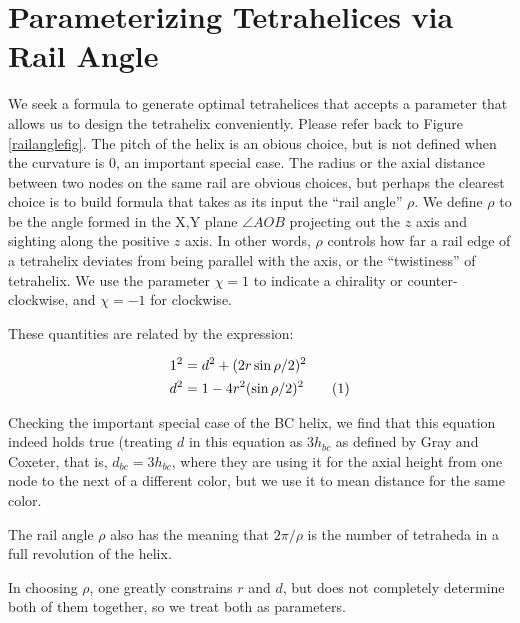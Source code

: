 \documentclass[11pt]{article}
\newcommand\numberthis{\addtocounter{equation}{1}\tag{\theequation}}
\begin{document}
\section{Parameterizing Tetrahelices via Rail Angle}

We seek a formula to generate optimal tetrahelices that accepts a
parameter that allows us to design the tetrahelix conveniently.
Please refer back to Figure \ref{railanglefig}.
The pitch of the helix is an obious choice, but is not defined when the
curvature is $0$, an important special case. The radius or the axial
distance between two nodes on the same rail are obvious choices, but
perhaps the clearest choice is to build formula that takes as its
input the ``rail angle'' $\rho$. We define $\rho$ to be the angle
formed in the X,Y plane $\angle A O B$ projecting out the $z$
axis and sighting along the positive $z$ axis. In other words, $\rho$
controls how far a rail edge of a tetrahelix deviates from being
parallel with the axis, or the ``twistiness'' of tetrahelix. We use
the parameter $\chi = 1$ to indicate a chirality or counter-clockwise,
and $\chi = -1$ for clockwise.



 These quantities are related by the expression:

\begin{align*}
  1^2 &= d^2 + (2 r \sin{ \rho / 2})^2 \\
  d^2 &= 1 - 4 r^2 (\sin{ \rho / 2})^2    \numberthis  \label{railangle} \\
\end{align*}

Checking the important special case of the BC helix, we find that this equation
indeed holds true (treating $d$ in this equation as $3 h_{bc}$ as defined by
Gray and Coxeter, that is, $d_{bc} = 3h_{bc}$, where they are using it for the axial height from one node to
the next of a different color, but we use it to mean distance for the same color.

The rail angle $\rho$ also has the meaning that $2 \pi / \rho$ is the number of
tetraheda in a full revolution of the helix.

In choosing $\rho$, one greatly constrains $r$ and $d$, but does not completely
determine both of them together, so we treat both as parameters.
\end{document}
